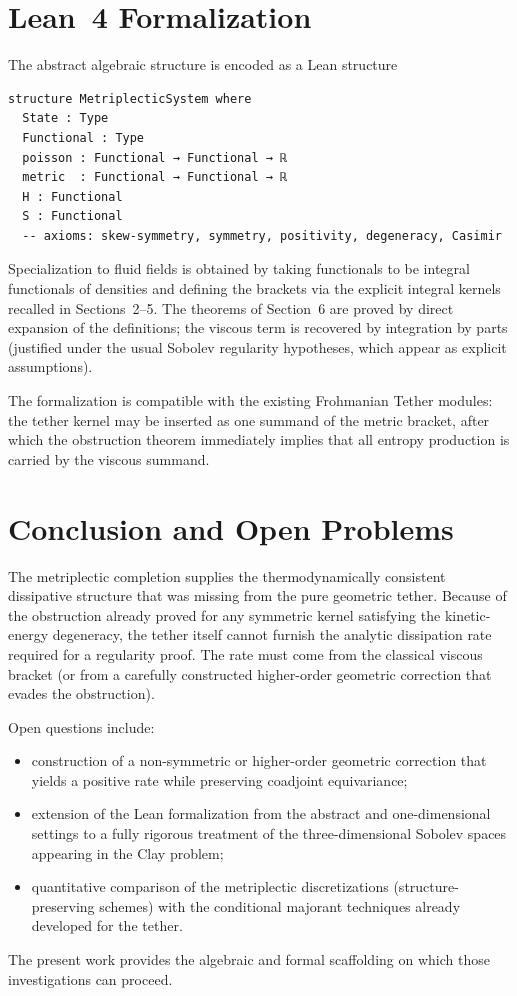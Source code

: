 \documentclass[11pt,a4paper]{article}
\begin{document}
\section{Lean~4 Formalization}
The abstract algebraic structure is encoded as a Lean structure
\begin{verbatim}
structure MetriplecticSystem where
  State : Type
  Functional : Type
  poisson : Functional → Functional → ℝ
  metric  : Functional → Functional → ℝ
  H : Functional
  S : Functional
  -- axioms: skew-symmetry, symmetry, positivity, degeneracy, Casimir
\end{verbatim}
Specialization to fluid fields is obtained by taking functionals to be integral functionals of densities and defining the brackets via the explicit integral kernels recalled in Sections~2--5. The theorems of Section~6 are proved by direct expansion of the definitions; the viscous term is recovered by integration by parts (justified under the usual Sobolev regularity hypotheses, which appear as explicit assumptions).

The formalization is compatible with the existing Frohmanian Tether modules: the tether kernel may be inserted as one summand of the metric bracket, after which the obstruction theorem immediately implies that all entropy production is carried by the viscous summand.

\section{Conclusion and Open Problems}
The metriplectic completion supplies the thermodynamically consistent dissipative structure that was missing from the pure geometric tether. Because of the obstruction already proved for any symmetric kernel satisfying the kinetic-energy degeneracy, the tether itself cannot furnish the analytic dissipation rate required for a regularity proof. The rate must come from the classical viscous bracket (or from a carefully constructed higher-order geometric correction that evades the obstruction). 

Open questions include:
\begin{itemize}
\item construction of a non-symmetric or higher-order geometric correction that yields a positive rate while preserving coadjoint equivariance;
\item extension of the Lean formalization from the abstract and one-dimensional settings to a fully rigorous treatment of the three-dimensional Sobolev spaces appearing in the Clay problem;
\item quantitative comparison of the metriplectic discretizations (structure-preserving schemes) with the conditional majorant techniques already developed for the tether.
\end{itemize}
The present work provides the algebraic and formal scaffolding on which those investigations can proceed.
\end{document}
